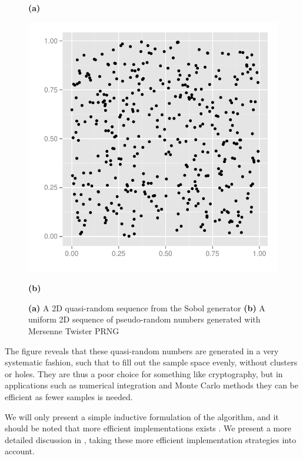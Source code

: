 \documentclass{llncs2e/llncs}
\begin{document}
\begin{figure}
\begin{minipage}{0.45\linewidth}
\begin{center}
      \hspace{0.55cm}\textbf{(a)}
    \end{center}
  \end{minipage}
  \begin{minipage}{0.45\linewidth}
    \begin{center}
      \includegraphics[width=\textwidth]{../report/graphics/2D-mersenne-sequence.pdf}

      \hspace{0.55cm}\textbf{(b)}
    \end{center}
  \end{minipage}

  \caption{\textbf{(a)} A 2D quasi-random sequence from the Sobol
    generator \textbf{(b)} A uniform 2D sequence of pseudo-random
    numbers generated with Mersenne Twister PRNG}
\label{fig:discrepancyplot}
\end{figure}

The figure reveals that these quasi-random numbers are generated in a
very systematic fashion, such that to fill out the sample space
evenly, without clusters or holes. They are thus a poor choice for
something like cryptography, but in applications such as numerical
integration and Monte Carlo methods they can be efficient as fewer
samples is needed. 

We will only present a simple inductive formulation of the algorithm,
and it should be noted that more efficient implementations exists
\cite{bratley1988algorithm, hwy2011emerald}. We present a more
detailed discussion in \cite{dybdalcarlsen2013thesis}, taking these
more efficient implementation strategies into account.
\end{document}
